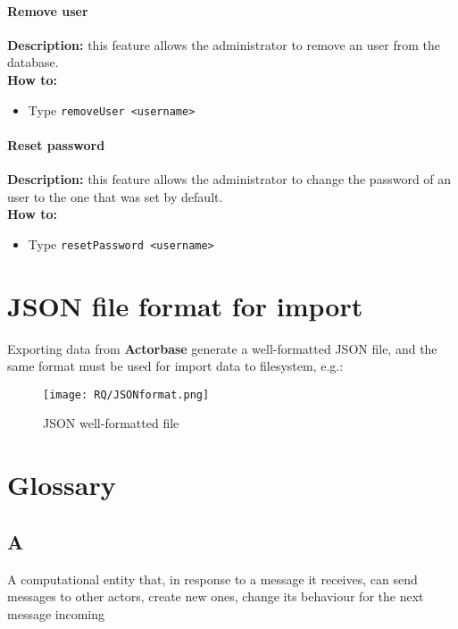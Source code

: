\documentclass{scalatekids-article}
\begin{document}
\paragraph{Remove user}
\label{sec:removeuser}
\textbf{Description:} this feature allows the administrator to remove an user from the database.\\
\textbf{How to:}
\begin{itemize}
\item Type \texttt{removeUser <username>}
\end{itemize}

\paragraph{Reset password}
\label{sec:resetpassword}
\textbf{Description:} this feature allows the administrator to change the password of an user to the one that was set by default.\\
\textbf{How to:}
\begin{itemize}
\item Type \texttt{resetPassword <username>}
\end{itemize}

\newpage
\appendix

\section{JSON file format for import}
\label{sec:JSONFormat}

Exporting data from \textbf{Actorbase} generate a well-formatted JSON file, and the same format must be
used for import data to filesystem, e.g.:

\begin{figure}[H]
  \begin{center}
    \texttt{[image: RQ/JSONformat.png]}
    \caption{JSON well-formatted file}
  \end{center}
\end{figure}

\listoffigures

\section{Glossary}
\label{sec:glossary}
\subsection{A}
   A computational entity that, in response to a message
  it receives, can send messages to other actors, create new ones, change its
  behaviour for the next message incoming\label{actor} \\
\end{document}
